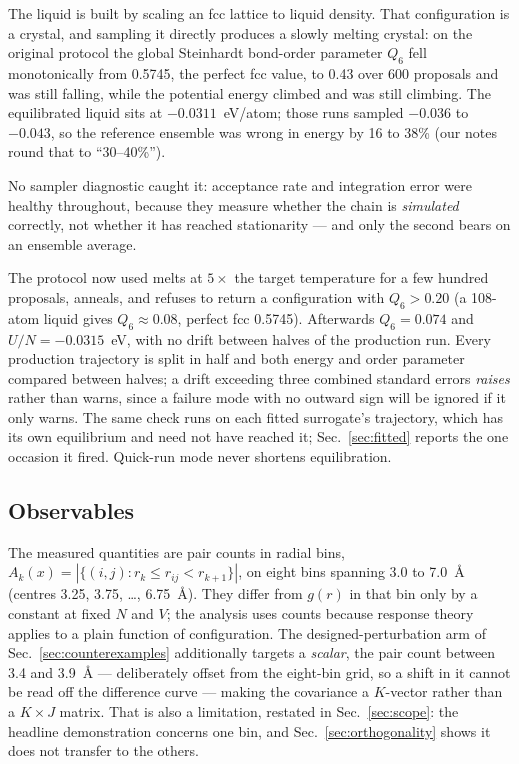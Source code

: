 \documentclass[aip,jcp,reprint,amsmath,amssymb,floatfix]{revtex4-2}
\begin{document}
The liquid is built by scaling an fcc lattice to liquid density. That
configuration is a crystal, and sampling it directly produces a slowly melting
crystal: on the original protocol the global Steinhardt bond-order
parameter\cite{Steinhardt1983, LechnerDellago2008} $Q_6$ fell monotonically from
0.5745, the perfect fcc value, to 0.43 over 600 proposals and was still falling,
while the potential energy climbed and was still climbing. The
equilibrated liquid sits at $-0.0311$~eV/atom; those runs sampled $-0.036$
to $-0.043$, so the reference ensemble was wrong in energy by 16 to
38\% (our notes round that to ``30--40\%'').

No sampler diagnostic caught it: acceptance rate and integration error were
healthy throughout, because they measure whether the chain is
\emph{simulated} correctly, not whether it has reached stationarity --- and
only the second bears on an ensemble average.

The protocol now used melts at $5\times$ the target temperature for a few
hundred proposals, anneals, and refuses to return a
configuration with $Q_6 > 0.20$ (a 108-atom liquid gives
$Q_6 \approx 0.08$, perfect fcc 0.5745). Afterwards
$Q_6 = 0.074$ and $U/N = -0.0315$~eV, with no drift
between halves of the production run. Every production trajectory is
split in half and both energy and order parameter compared between
halves; a drift exceeding three combined standard errors \emph{raises} rather
than warns, since a failure mode with no outward sign will be ignored if it
only warns. The same check runs on each fitted surrogate's
trajectory, which has its own equilibrium and need not have reached
it; Sec.~\ref{sec:fitted} reports the one occasion it fired. Quick-run
mode never shortens equilibration.

\subsection{Observables}

The measured quantities are pair counts in radial bins,
$A_k(x) = |\{(i,j) : r_k \le r_{ij} < r_{k+1}\}|$, on eight bins spanning 3.0 to
7.0~\AA{} (centres 3.25, 3.75, \dots, 6.75~\AA). They differ from $g(r)$ in that
bin only by a constant at fixed $N$ and $V$\cite{AllenTildesley2017}; the
analysis uses counts because response theory applies to a plain function of
configuration. The designed-perturbation arm
of Sec.~\ref{sec:counterexamples} additionally targets a \emph{scalar}, the pair
count between 3.4 and 3.9~\AA{} --- deliberately
offset from the eight-bin grid, so a shift in it cannot be read off the
difference curve --- making the covariance a $K$-vector rather
than a $K\times J$ matrix. That is also a
limitation, restated in Sec.~\ref{sec:scope}: the headline demonstration
concerns one bin, and Sec.~\ref{sec:orthogonality} shows it does
not transfer to the others.
\end{document}
